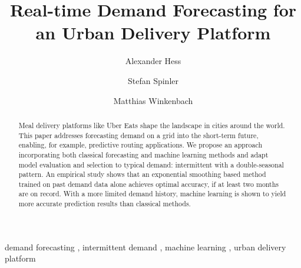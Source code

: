 \begin{frontmatter}

\title{Real-time Demand Forecasting for an Urban Delivery Platform}

\author[WHU]{Alexander Hess}
\author[WHU]{Stefan Spinler}
\author[MIT]{Matthias Winkenbach}
\address[WHU]{
WHU - Otto Beisheim School of Management,
Burgplatz 2, 56179 Vallendar, Germany
}
\address[MIT]{
Massachusetts Institute of Technology,
77 Massachusetts Avenue, Cambridge, MA 02139, United States
}


\begin{abstract}
Meal delivery platforms like Uber Eats shape the landscape in cities around the world.
This paper addresses forecasting demand on a grid into the short-term future,
    enabling, for example, predictive routing applications.
We propose an approach incorporating
    both classical forecasting and machine learning methods
    and adapt model evaluation and selection to typical demand:
        intermittent with a double-seasonal pattern.
An empirical study shows that
    an exponential smoothing based method trained on past demand data alone
        achieves optimal accuracy,
    if at least two months are on record.
With a more limited demand history,
    machine learning is shown
    to yield more accurate prediction results than classical methods.
\end{abstract}

\begin{keyword}
demand forecasting \sep
intermittent demand \sep
machine learning \sep
urban delivery platform
\end{keyword}

\end{frontmatter}